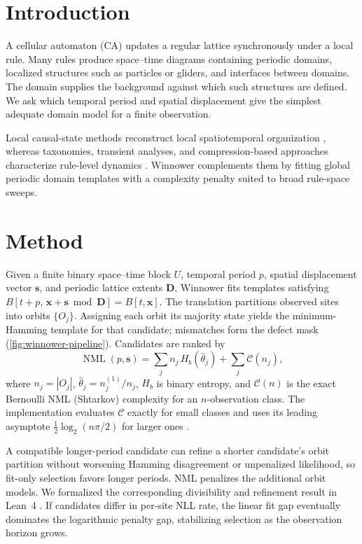 \documentclass[letterpaper]{article}
\newcommand{\bs}{\mathbf{s}}
\newcommand{\bD}{\mathbf{D}}
\newcommand{\NML}{\operatorname{NML}}
\newcommand{\Hb}{H_b}
\begin{document}
\section{Introduction}
A cellular automaton (CA) updates a regular lattice synchronously under a local
rule. Many rules produce space--time diagrams containing periodic domains,
localized structures such as particles or gliders, and interfaces between
domains. The domain supplies the background against which such structures are
defined. We ask which temporal period and spatial displacement give the simplest
adequate domain model for a finite observation.

Local causal-state methods reconstruct local spatiotemporal organization
\citep{rupe2024}, whereas taxonomies, transient analyses, and compression-based
approaches characterize rule-level dynamics
\citep{vispoel2022,rollier2024,hudcova2021,alfaro2024,cisneros2023}. Winnower
complements them by fitting global periodic domain templates with a complexity
penalty suited to broad rule-space sweeps.

\section{Method}
Given a finite binary space--time block $U$, temporal period $p$, spatial
displacement vector $\bs$, and periodic lattice extents $\bD$, Winnower fits
templates satisfying
$B[t{+}p,\,\mathbf{x}{+}\bs \bmod \bD]=B[t,\mathbf{x}]$. The translation
partitions observed sites into orbits $\{O_j\}$. Assigning each orbit its
majority state yields the minimum-Hamming template for that candidate;
mismatches form the defect mask (\cref{fig:winnower-pipeline}). Candidates are
ranked by
%
\begin{equation}
\NML(p,\bs)=\sum_j n_j\,\Hb(\hat\theta_j)+\sum_j \mathcal{C}(n_j),
\label{eq:nml}
\end{equation}
%
where $n_j=|O_j|$, $\hat\theta_j=n_j^{(1)}/n_j$, $\Hb$ is binary entropy, and
$\mathcal{C}(n)$ is the exact Bernoulli NML (Shtarkov) complexity for an
$n$-observation class. The implementation evaluates $\mathcal{C}$ exactly for
small classes and uses its leading asymptote
$\tfrac12\log_2(n\pi/2)$ for larger ones
\citep{shtarkov1987,grunwald2007,yamanishi2023}.

A compatible longer-period candidate can refine a shorter candidate's orbit
partition without worsening Hamming disagreement or unpenalized likelihood, so
fit-only selection favors longer periods. NML penalizes the additional orbit
models. We formalized the corresponding divisibility and refinement result in
Lean~4 \citep{achim2025}. If candidates differ in per-site NLL rate, the linear
fit gap eventually dominates the logarithmic penalty gap, stabilizing selection
as the observation horizon grows.
\end{document}
